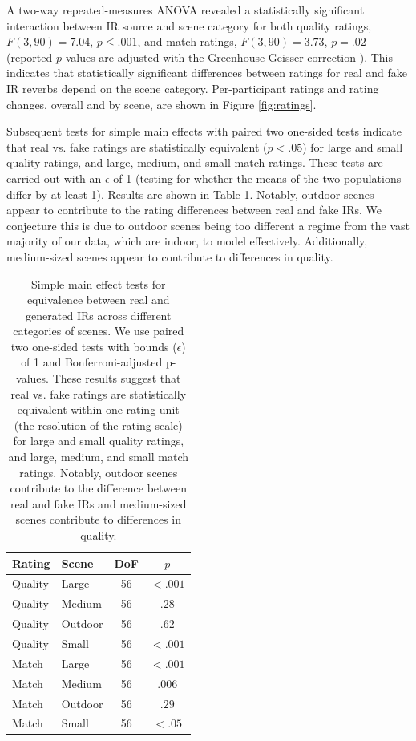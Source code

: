 \documentclass[10pt,twocolumn,letterpaper]{article}
\begin{document}
A two-way repeated-measures ANOVA revealed a statistically significant interaction between IR source and scene category for both quality ratings, $F(3, 90)=7.04$, $p\leq .001$, and match ratings, $F(3, 90)=3.73$, $p=.02$ (reported $p$-values are adjusted with the Greenhouse-Geisser correction \cite{greenhouse1959methods}). This indicates that statistically significant differences between ratings for real and fake IR reverbs depend on the scene category. Per-participant ratings and rating changes, overall and by scene, are shown in Figure \ref{fig:ratings}.

Subsequent tests for simple main effects with paired two one-sided tests indicate that real vs. fake ratings are statistically equivalent ($p<.05$) for large and small quality ratings, and large, medium, and small match ratings. These tests are carried out with an $\epsilon$ of 1 (testing for whether the means of the two populations differ by at least 1). Results are shown in Table \ref{tab:ratings_maineffects}. Notably, outdoor scenes appear to contribute to the rating differences between real and fake IRs. We conjecture this is due to outdoor scenes being too different a regime from the vast majority of our data, which are indoor, to model effectively. Additionally, medium-sized scenes appear to contribute to differences in quality.

\begin{table}
    \small
    \centering
    \begin{tabular}{llcc}
        Rating & Scene & DoF & $p$\\
        \hline
        Quality & Large & 56 & \textbf{$<.001$} \\
        Quality & Medium & 56 & $.28$ \\
        Quality & Outdoor & 56 & $.62$ \\
        Quality & Small & 56 & \textbf{$<.001$} \\
        Match & Large & 56 & \textbf{$<.001$} \\
        Match & Medium & 56 & \textbf{$.006$} \\
        Match & Outdoor & 56 & $.29$ \\
        Match & Small & 56 & \textbf{$<.05$} \\
        
    \end{tabular}
    \caption{Simple main effect tests for equivalence between real and generated IRs across different categories of scenes. We use paired two one-sided tests with bounds ($\epsilon$) of 1 and Bonferroni-adjusted p-values. These results suggest that real vs. fake ratings are statistically equivalent within one rating unit (the resolution of the rating scale) for large and small quality ratings, and large, medium, and small match ratings. Notably, outdoor scenes contribute to the difference between real and fake IRs and medium-sized scenes contribute to differences in quality.}
    \label{tab:ratings_maineffects}
\end{table}
\end{document}
